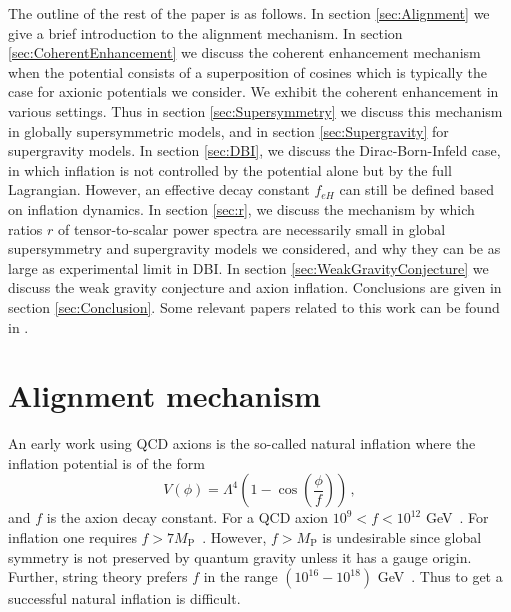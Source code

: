 \documentclass[12pt]{article}
\begin{document}
The outline of the rest of the paper is as follows.
In section \ref{sec:Alignment} we give a brief introduction to the alignment mechanism.
In section \ref{sec:CoherentEnhancement} we discuss the coherent enhancement mechanism when the potential consists of a superposition of cosines which is typically the case for axionic potentials we consider.
We exhibit the coherent enhancement in various settings.
Thus in section \ref{sec:Supersymmetry} we discuss this mechanism in globally supersymmetric models, and in section \ref{sec:Supergravity} for supergravity models.
In section \ref{sec:DBI}, we discuss the Dirac-Born-Infeld case, in which inflation is not controlled by the potential alone but by the full Lagrangian.
However, an effective decay constant $f_{eH}$ can still be defined based on inflation dynamics.
In section \ref{sec:r}, we discuss the mechanism by which ratios $r$ of tensor-to-scalar power spectra are necessarily small in global supersymmetry and supergravity models we considered, and why they can be as large as experimental limit in DBI.
In section \ref{sec:WeakGravityConjecture} we discuss the weak gravity conjecture and axion inflation.
Conclusions are given in section \ref{sec:Conclusion}.
Some relevant papers related to this work can be found in \cite{BlancoPillado:2006he, Conlon:2005jm, Ben-Dayan:2014lca, Gao:2014uha}.

\section{Alignment mechanism \label{sec:Alignment}}
An early work using QCD axions is the so-called natural inflation where the inflation potential is of the form
\begin{equation} \label{eq:naturalInflationPotential}
  V\left(\phi\right) = \Lambda^4 \left(1 - \cos\left(\frac{\phi}{f}\right)\right)\,,
\end{equation}
and $f$ is the axion decay constant.
For a QCD axion $10^9 < f < 10^{12}$ GeV~\cite{Svrcek:2006yi}.
For inflation one requires $f > 7 M_\text{P}$~\cite{Akrami:2018odb}.
However, $f > M_\text{P}$ is undesirable since global symmetry is not preserved by quantum gravity unless it has a gauge origin.
Further, string theory prefers $f$ in the range $\left(10^{16} - 10^{18}\right)$ GeV~\cite{Svrcek:2006yi}.
Thus to get a successful natural inflation is difficult.
\end{document}
